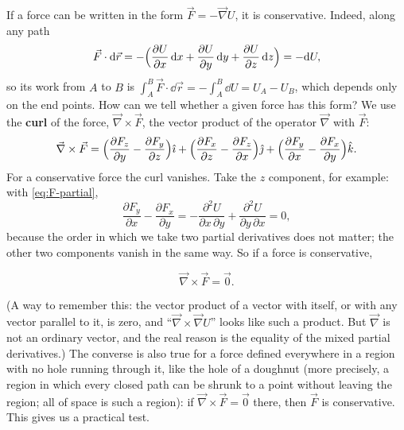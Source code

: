 \documentclass[11pt,a4paper]{article}
\begin{document}
If a force can be written in the form $\vec{F} = -\vec{\nabla} U$, it is conservative. Indeed, along
any path
\[
  \vec{F}\cdot\mathrm{d}\vec{r} = -\Bigl(\frac{\partial U}{\partial x}\,\mathrm{d} x
  + \frac{\partial U}{\partial y}\,\mathrm{d} y + \frac{\partial U}{\partial z}\,\mathrm{d} z\Bigr) = -\mathrm{d} U ,
\]
so its work from $A$ to $B$ is $\int_A^B \vec{F}\cdot\dd\vec{r} = -\int_A^B \dd U = U_A - U_B$,
which depends only on the end points. How can we tell whether a given force has this form? We use the
\textbf{curl} of the force, $\vec{\nabla}\times\vec{F}$, the vector product of the operator
$\vec{\nabla}$ with $\vec{F}$:
\[
  \vec{\nabla}\times\vec{F} = \Bigl(\frac{\partial F_z}{\partial y} - \frac{\partial F_y}{\partial z}\Bigr)\hat{\imath}
  + \Bigl(\frac{\partial F_x}{\partial z} - \frac{\partial F_z}{\partial x}\Bigr)\hat{\jmath}
  + \Bigl(\frac{\partial F_y}{\partial x} - \frac{\partial F_x}{\partial y}\Bigr)\hat{k} .
\]
For a conservative force the curl vanishes. Take the $z$ component, for example: with
\eqref{eq:F-partial},
\[
  \frac{\partial F_y}{\partial x} - \frac{\partial F_x}{\partial y}
  = -\frac{\partial^2 U}{\partial x\,\partial y} + \frac{\partial^2 U}{\partial y\,\partial x} = 0 ,
\]
because the order in which we take two partial derivatives does not matter; the other two components
vanish in the same way. So if a force is conservative,
\begin{keyresult}
\begin{equation}\label{eq:curl}
  \vec{\nabla}\times\vec{F} = \vec{0} .
\end{equation}
\end{keyresult}
(A way to remember this: the vector product of a vector with itself, or with any vector parallel to
it, is zero, and ``$\vec{\nabla}\times\vec{\nabla}U$'' looks like such a product. But $\vec{\nabla}$
is not an ordinary vector, and the real reason is the equality of the mixed partial derivatives.)
The converse is also true for a force defined everywhere in a region with no hole running through
it, like the hole of a doughnut (more precisely, a region in which every closed path can be shrunk
to a point without leaving the region; all of space is such a region): if
$\vec{\nabla}\times\vec{F} = \vec{0}$ there, then $\vec{F}$ is conservative. This gives us a
practical test.
\end{document}
